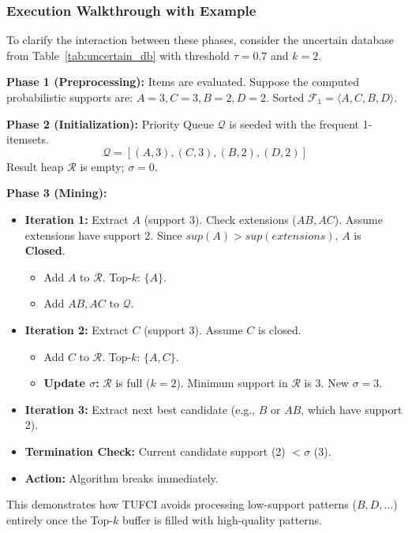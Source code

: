 \documentclass[10pt,letterpaper]{article}
\begin{document}
\subsubsection*{Execution Walkthrough with Example}
To clarify the interaction between these phases, consider the uncertain database from Table~\ref{tab:uncertain_db} with threshold $\tau=0.7$ and $k=2$.

\textbf{Phase 1 (Preprocessing):} 
Items are evaluated. Suppose the computed probabilistic supports are: $A=3, C=3, B=2, D=2$.
Sorted $\mathcal{F}_1 = \langle A, C, B, D \rangle$.

\textbf{Phase 2 (Initialization):} 
Priority Queue $\mathcal{Q}$ is seeded with the frequent 1-itemsets.
\begin{equation}
\mathcal{Q} = [ (A, 3), (C, 3), (B, 2), (D, 2) ]
\end{equation}
Result heap $\mathcal{R}$ is empty; $\sigma = 0$.

\textbf{Phase 3 (Mining):}
\begin{itemize}
    \item \textbf{Iteration 1:} Extract $A$ (support 3). Check extensions ($AB, AC$). Assume extensions have support 2. Since $sup(A) > sup(extensions)$, $A$ is \textbf{Closed}. 
    \begin{itemize}
        \item Add $A$ to $\mathcal{R}$. Top-$k$: $\{A\}$.
        \item Add $AB, AC$ to $\mathcal{Q}$.
    \end{itemize}
    \item \textbf{Iteration 2:} Extract $C$ (support 3). Assume $C$ is closed.
    \begin{itemize}
        \item Add $C$ to $\mathcal{R}$. Top-$k$: $\{A, C\}$.
        \item \textbf{Update $\sigma$:} $\mathcal{R}$ is full ($k=2$). Minimum support in $\mathcal{R}$ is 3. New $\sigma = 3$.
    \end{itemize}
    \item \textbf{Iteration 3:} Extract next best candidate (e.g., $B$ or $AB$, which have support 2).
    \item \textbf{Termination Check:} Current candidate support (2) $< \sigma$ (3). 
    \item \textbf{Action:} Algorithm breaks immediately.
\end{itemize}
This demonstrates how TUFCI avoids processing low-support patterns ($B, D, \dots$) entirely once the Top-$k$ buffer is filled with high-quality patterns.
\end{document}
